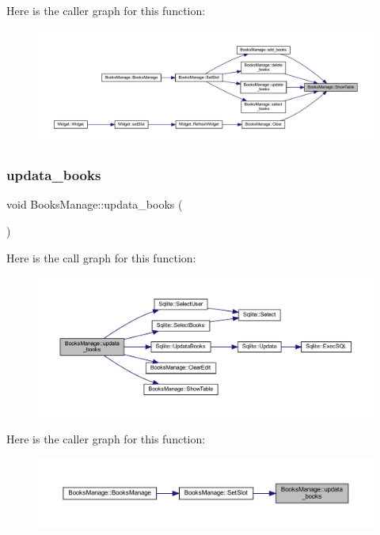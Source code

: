 Here is the caller graph for this function\+:
\nopagebreak
\begin{figure}[H]
\begin{center}
\leavevmode
\includegraphics[width=350pt]{class_books_manage_abbacf5e112bdee769aaa4d22c0e14744_icgraph}
\end{center}
\end{figure}
\mbox{\label{class_books_manage_aba42cfe2129f1b92dab5a08e1f73ee07}} 
\subsubsection{\texorpdfstring{updata\_books}{updata\_books}}
{\footnotesize\ttfamily void Books\+Manage\+::updata\+\_\+books (\begin{DoxyParamCaption}{ }\end{DoxyParamCaption})\hspace{0.3cm}{\ttfamily [slot]}}

Here is the call graph for this function\+:
\nopagebreak
\begin{figure}[H]
\begin{center}
\leavevmode
\includegraphics[width=350pt]{class_books_manage_aba42cfe2129f1b92dab5a08e1f73ee07_cgraph}
\end{center}
\end{figure}
Here is the caller graph for this function\+:
\nopagebreak
\begin{figure}[H]
\begin{center}
\leavevmode
\includegraphics[width=350pt]{class_books_manage_aba42cfe2129f1b92dab5a08e1f73ee07_icgraph}
\end{center}
\end{figure}



